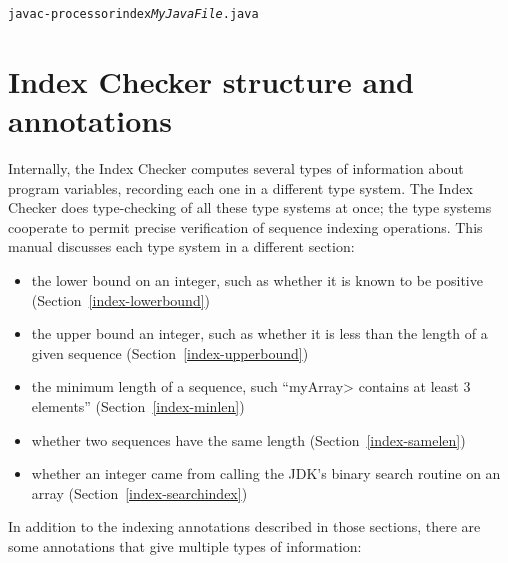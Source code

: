 \begin{alltt}
  javac -processor index \emph{MyJavaFile}.java
\end{alltt}


\section{Index Checker structure and annotations\label{index-annotations}}

Internally, the Index Checker computes several types of information about
program variables, recording each one in a different type system.  The
Index Checker does type-checking of all these type systems at once; the
type systems cooperate to permit precise verification of sequence indexing
operations.  This manual discusses each type system in a different
section:
\begin{itemize}
\item
  the lower bound on an integer, such as whether it is known to be positive
  (Section~\ref{index-lowerbound})
\item
  the upper bound an integer, such as whether it is less than the length
  of a given sequence (Section~\ref{index-upperbound})
\item
  the minimum length of a sequence, such ``\<myArray> contains at least 3
  elements'' (Section~\ref{index-minlen})
\item
  whether two sequences have the same length (Section~\ref{index-samelen})
\item
  whether an integer came from calling the JDK's binary search routine on
  an array (Section~\ref{index-searchindex})
\end{itemize}

In addition to the indexing annotations described in those sections, there
are some annotations that give multiple types of information:

